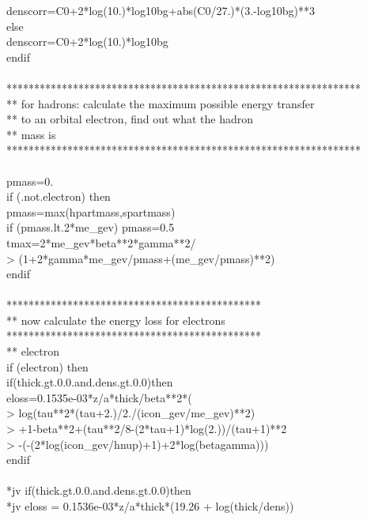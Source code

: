 {         denscorr=C0+2*log(10.)*log10bg+abs(C0/27.)*(3.-log10bg)**3\\
      else\\
         denscorr=C0+2*log(10.)*log10bg\\
      endif\\
 \\
****************************************************************\\
** for hadrons: calculate the maximum possible energy transfer \\
**		to an orbital electron, find out what the hadron \\
**		mass is\\
****************************************************************\\
 \\
      pmass=0.\\
      if (.not.electron) then\\
         pmass=max(hpartmass,spartmass)\\
         if (pmass.lt.2*me\_gev) pmass=0.5\\
         tmax=2*me\_gev*beta**2*gamma**2/\\
     >        (1+2*gamma*me\_gev/pmass+(me\_gev/pmass)**2)\\
      endif\\
 \\
**********************************************\\       
** now calculate the energy loss for electrons \\
**********************************************\\
** electron\\
      if (electron) then\\
         if(thick.gt.0.0.and.dens.gt.0.0)then\\
            eloss=0.1535e-03*z/a*thick/beta**2*(\\
     >           log(tau**2*(tau+2.)/2./(icon\_gev/me\_gev)**2)\\
     >           +1-beta**2+(tau**2/8-(2*tau+1)*log(2.))/(tau+1)**2\\
     >           -(-(2*log(icon\_gev/hnup)+1)+2*log(betagamma)))\\
         endif\\
 \\
*jv        if(thick.gt.0.0.and.dens.gt.0.0)then\\
*jv           eloss = 0.1536e-03*z/a*thick*(19.26 + log(thick/dens))\\
}

